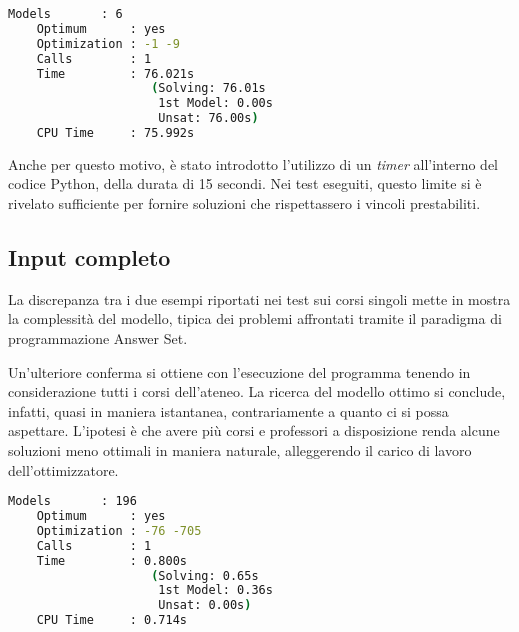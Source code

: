 \begin{lstlisting}[language=bash, captionpos=b, 
    caption={Statistiche clingo per il corso 3024.}, 
    label={lst:stat_3024},
    backgroundcolor=\color{lightgray!20},
    basicstyle=\ttfamily\footnotesize]
    Models       : 6
    Optimum      : yes
    Optimization : -1 -9
    Calls        : 1
    Time         : 76.021s 
                    (Solving: 76.01s 
                     1st Model: 0.00s 
                     Unsat: 76.00s)
    CPU Time     : 75.992s
\end{lstlisting}

Anche per questo motivo, è stato introdotto l'utilizzo di un \textit{timer} all'interno 
del codice Python, della durata di 15 secondi.
Nei test eseguiti, questo limite si è rivelato sufficiente per fornire soluzioni 
che rispettassero i vincoli prestabiliti.

\subsection{Input completo}
La discrepanza tra i due esempi riportati nei test sui corsi singoli mette in 
mostra la complessità del modello, tipica dei problemi affrontati tramite il 
paradigma di programmazione Answer Set.

Un'ulteriore conferma si ottiene con l'esecuzione del programma tenendo in 
considerazione tutti i corsi dell'ateneo. La ricerca del modello ottimo 
si conclude, infatti, quasi in maniera istantanea, contrariamente a quanto 
ci si possa aspettare.
L'ipotesi è che avere più corsi e professori a disposizione renda alcune soluzioni 
meno ottimali in maniera naturale, alleggerendo il carico di lavoro
dell'ottimizzatore.

\begin{lstlisting}[language=bash, captionpos=b, 
    caption={Statistiche clingo per tutti i corsi.}, 
    label={lst:stat_all},
    backgroundcolor=\color{lightgray!20},
    basicstyle=\ttfamily\footnotesize]
    Models       : 196
    Optimum      : yes
    Optimization : -76 -705
    Calls        : 1
    Time         : 0.800s 
                    (Solving: 0.65s 
                     1st Model: 0.36s 
                     Unsat: 0.00s)
    CPU Time     : 0.714s
\end{lstlisting}

